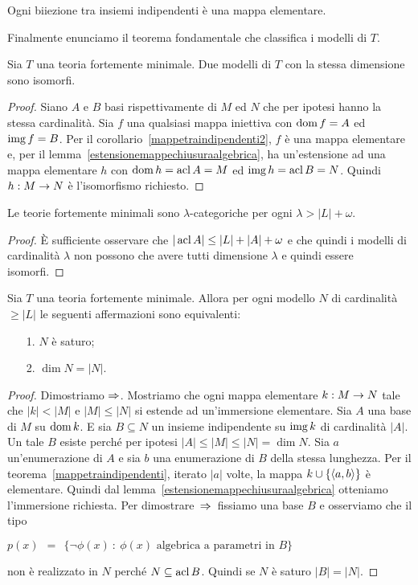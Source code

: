 \begin{corollary}\label{mappetraindipendenti2} 
Ogni biiezione tra insiemi indipendenti \`e una mappa elementare.\QED
\end{corollary}

Finalmente enunciamo il teorema fondamentale che classifica i modelli di $T$.

\begin{theorem}
Sia $T$ una teoria fortemente minimale. Due modelli di $T$ con la stessa dimensione sono isomorfi.
\end{theorem}
\begin{proof}
Siano $A$ e $B$ basi rispettivamente di $M$ ed $N$ che per ipotesi hanno la stessa cardinalit\`a. Sia $f$ una qualsiasi mappa iniettiva con $\mathop{\rm dom} f=A$ ed $\mathop{\rm img} f=B$. Per il corollario~\ref{mappetraindipendenti2}, $f$ \`e una mappa elementare e, per il lemma~\ref{estensionemappechiusuraalgebrica}, ha un'estensione ad una mappa elementare $h$ con $\mathop{\rm dom} h=\mathop{\rm acl} A=M$ ed $\mathop{\rm img} h=\mathop{\rm acl} B=N$. Quindi $h:M\rightarrow N$ \`e l'isomorfismo richiesto.
\end{proof}

\begin{corollary} 
Le teorie fortemente minimali sono $\lambda$-categoriche per ogni $\lambda>|L|+\omega$.
\end{corollary}
\begin{proof}
\`E sufficiente osservare che $|\mathop{\rm acl} A|\le |L|+|A|+\omega$ e che quindi i modelli di cardinalit\`a $\lambda$ non possono che avere tutti dimensione $\lambda$ e quindi essere isomorfi.
\end{proof}

\begin{theorem} 
Sia $T$ una teoria fortemente minimale. Allora per ogni modello $N$ di cardinalit\`a $\ge|L|$ le seguenti affermazioni sono equivalenti:
\begin{itemize}
\item[1.] $N$ \`e saturo;
\item[2.] $\dim N=|N|$.
\end{itemize}
\end{theorem}

\begin{proof}
Dimostriamo $\Rightarrow$. Mostriamo che ogni mappa elementare $k:M\rightarrow N$ tale che $|k|<|M|$ e $|M|\le|N|$ si estende ad un'immersione elementare. Sia $A$ una base di $M$ su $\mathop{\rm dom} k$.  E sia $B\subseteq N$ un insieme indipendente su $\mathop{\rm img} k$ di cardinalit\`a $|A|$. Un tale $B$ esiste perch\'e per ipotesi $|A|\le|M|\le|N|=\dim N$. Sia $a$ un'enumerazione di $A$ e sia $b$ una enumerazione di $B$ della stessa lunghezza. Per il teorema~\ref{mappetraindipendenti}, iterato $|a|$ volte, la mappa $k\cup\{\langle a,b\rangle\}$ \`e elementare. Quindi dal lemma~\ref{estensionemappechiusuraalgebrica} otteniamo l'immersione richiesta.
Per dimostrare $\,\Rightarrow\,$ fissiamo una base $B$ e osserviamo che il tipo

\hfil $p(x)\ \ =\ \ \Big\{\neg\phi(x)\ :\ \phi(x)\textrm{ algebrica a parametri in }B\Big\}$

non \`e realizzato in $N$ perch\'e $N\subseteq\mathop{\rm acl} B$. Quindi se $N$ \`e saturo $|B|=|N|$.
\end{proof}

